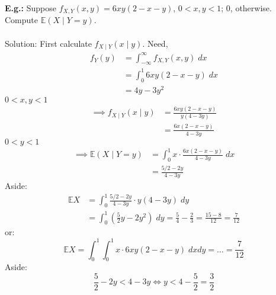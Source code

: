 \documentclass[a4paper]{article}
\newcommand{\n}{\hfill\break}
\newcommand{\eg}[1]{\par\noindent\settowidth{\hangindent}{\textbf{E.g.: }}\textbf{E.g.: }#1\n}
\newcommand{\Avg}{\mathbb{E}}
\newcommand{\E}{\Avg}
\begin{document}
\eg{
    Suppose $f_{X,Y}(x,y)=6xy(2-x-y)$, $0<x,y<1$; $0$, otherwise. Compute $\E(X\mid Y=y)$. \\\\
    Solution: First calculate $f_{X\mid Y}(x\mid y)$. Need,
    \begin{align*}
        f_Y(y)&=\int_{-\infty}^\infty f_{X,Y}(x,y)\;dx \\
        &=\int_0^1 6xy(2-x-y)\;dx \\
        &=4y-3y^2
    \end{align*}
    $0<x,y<1$
    \begin{align*}
        \implies f_{X\mid Y}(x\mid y)&=\frac{6xy(2-x-y)}{y(4-3y)} \\
        &=\frac{6x(2-x-y)}{4-3y}
    \end{align*}
    $0<y<1$
    \begin{align*}
        \implies \E(X\mid Y=y) &= \int^1_0 x\cdot\frac{6x(2-x-y)}{4-3y}\;dx \\
        &=\frac{5/2-2y}{4-3y}
    \end{align*}
    Aside: 
    \begin{align*}
        \E X &= \int^1_0\frac{5/2-2y}{4-3y}\cdot y(4-3y)\;dy \\
        &=\int^1_0\left(\frac{5}{2}y-2y^2\right)\;dy=\frac{5}{4}-\frac{2}{3}=\frac{15-8}{12}=\frac{7}{12}
    \end{align*}
    or:
    \[\E X = \int^1_0\int^1_0 x\cdot 6xy(2-x-y)\;dxdy=\dots=\frac{7}{12}\]
    Aside:
    \[\frac{5}{2}-2y < 4-3y \iff y<4-\frac{5}{2}=\frac{3}{2}\]
}
\end{document}
